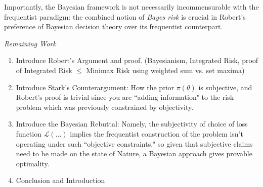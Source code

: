 \documentclass[letterpaper,12pt]{article}
\begin{document}
Importantly, the Bayesian framework is not necessarily incommensurable with the frequentist paradigm: the combined notion of \textit{Bayes risk} is crucial in Robert's preference of Bayesian decision theory over its frequentist counterpart. 

\textit{Remaining Work}
\begin{enumerate}\item{Introduce Robert's Argument and proof. (Bayesianism, Integrated Risk, proof of Integrated Risk $\leq$ Minimax Risk using weighted sum vs. set maxima)} 
\item{Introduce Stark's Counterargument: How the prior $\pi(\theta)$ is subjective, and Robert's proof is trivial since you are ``adding information" to the risk problem which was previously constrained by objectivity.}
\item{Introduce the Bayesian Rebuttal: Namely, the subjectivity of choice of loss function $\mathcal{L}(\dots)$ implies the frequentist construction of the problem isn't operating under such ``objective constraints," so given that subjective claims need to be made on the state of Nature, a Bayesian approach gives provable optimality. }
\item{Conclusion and Introduction }
 \end{enumerate}
\end{document}
